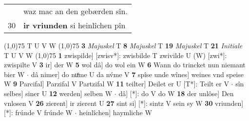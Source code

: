 \documentclass[8pt,a4paper,notitlepage]{article}
\begin{document}
\begin{table}[ht]
\begin{minipage}[t]{0.5\linewidth}
\begin{tabular}{rl}
 & waz mac an den gebærden sîn.\\ 
30 & \textbf{ir vriunden} si heinlîchen pîn\\ 
\end{tabular}
\scriptsize
\line(1,0){75} \newline
T U V W \newline
\line(1,0){75} \newline
\textbf{3} \textit{Majuskel} T  \textbf{8} \textit{Majuskel} T  \textbf{19} \textit{Majuskel} T  \textbf{21} \textit{Initiale} T U V W  \newline
\line(1,0){75} \newline
\textbf{1} zwispilde] [zwisv*]: zwisbilde T zwivilde U (W) [zwi*]: zwispilte  V \textbf{3} ir] der W \textbf{5} wol dâ] do wol ein W \textbf{6} Wann do trincket nun niemant bier W  $\cdot$ dâ nimer] do nuͦme U da nv́me V \textbf{7} spîse unde wînes] weines vnd speise W \textbf{9} Parcifal] Parzifal V Partzifal W \textbf{11} teilter] Deilet er U [T*]: Teilt er V  $\cdot$ sîn selbes] siner U \textbf{12} werden] selben W  $\cdot$ dâ] [*]: do V do W \textbf{18} der unlôse] Den vnlosen V \textbf{26} zierent] ir zierent U \textbf{27} sint si] [*]: sintz V sein sy W \textbf{30} vriunden] [*]: frúnde V frúnde W  $\cdot$ heinlîchen] haymliche W \newline
\end{minipage}
\end{table}
\end{document}
